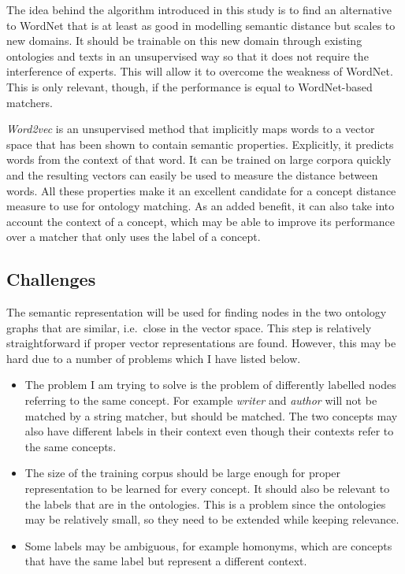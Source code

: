 \documentclass{article}
\begin{document}
 The idea behind the algorithm introduced in this study is to find an alternative to WordNet that is at least as good in modelling semantic distance but scales to new domains. It should be trainable on this new domain through existing ontologies and texts in an unsupervised way so that it does not require the interference of experts. This will allow it to overcome the weakness of WordNet. This is only relevant, though, if the performance is equal to WordNet-based matchers.
 
 \emph{Word2vec} is an unsupervised method that implicitly maps words to a vector space that has been shown to contain semantic properties. Explicitly, it predicts words from the context of that word. %
 It can be trained on large corpora quickly and the resulting vectors can easily be used to measure the distance between words. All these properties make it an excellent candidate for a concept distance measure to use for ontology matching. As an added benefit, it can also take into account the context of a concept, which may be able to improve its performance over a matcher that only uses the label of a concept. 
 
 \subsection{Challenges}
 The semantic representation will be used for finding nodes in the two ontology graphs that are similar, i.e.\ close in the vector space. This step is relatively straightforward if proper vector representations are found. However, this may be hard due to a number of problems which I have listed below.

 \begin{itemize}
  \item The problem I am trying to solve is the problem of differently labelled nodes referring to the same concept. For example \emph{writer} and \emph{author} will not be matched by a string matcher, but should be matched. The two concepts may also have different labels in their context even though their contexts refer to the same concepts.
  \item The size of the training corpus should be large enough for proper representation to be learned for every concept. It should also be relevant to the labels that are in the ontologies. This is a problem since the ontologies may be relatively small, so they need to be extended while keeping relevance.
  \item Some labels may be ambiguous, for example homonyms, which are concepts that have the same label but represent a different context.
 \end{itemize}
 
\end{document}
